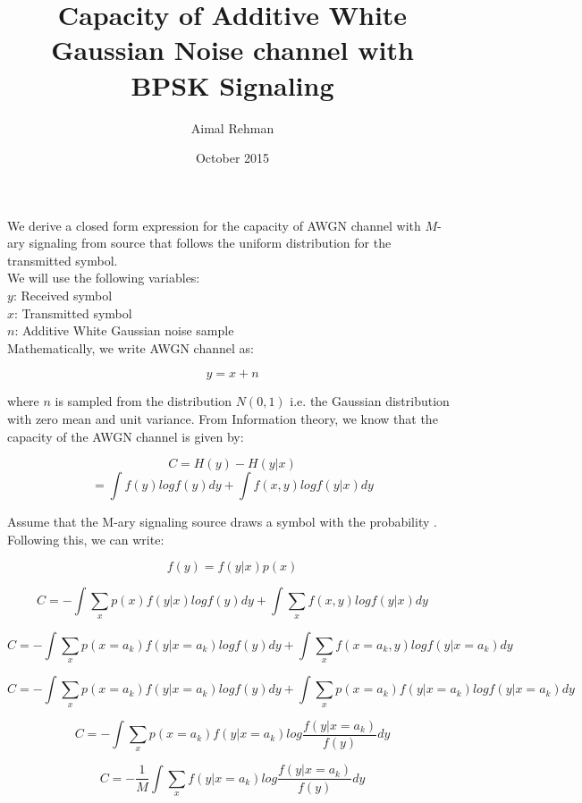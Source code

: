 \documentclass{article}
\title{Capacity of Additive White Gaussian Noise channel with BPSK Signaling}
\author{Aimal Rehman}
\date{October 2015}
\begin{document}
\maketitle

\noindent We derive a closed form expression for the capacity of AWGN channel with $M$-ary signaling from source that follows the uniform distribution for the transmitted symbol.
\\
\noindent We will use the following variables:\\
$y$: Received symbol\\
$x$: Transmitted symbol\\
$n$: Additive White Gaussian noise sample\\

\noindent Mathematically, we write AWGN channel as:

\[y = x + n \]

\noindent where $n$ is sampled from the distribution $N(0,1)$ i.e. the Gaussian distribution with zero mean and unit variance. From Information theory, we know that the capacity of the AWGN channel is given by:

\[C = H(y) - H(y|x) \]
\[= \int f(y) log f(y) dy + \int f(x,y) log f(y|x) dy \]

\noindent Assume that the M-ary signaling source  draws a symbol  with the probability . Following this, we can write:

\[f(y) = f(y|x)p(x) \]

\[C = -\int\sum_x p(x)f(y|x)logf(y) dy + \int\sum_x f(x,y) log f(y|x) dy \]

\[C = -\int\sum_x p(x=a_k)f(y|x=a_k) log f(y) dy + \int\sum_x f(x=a_k,y) log f(y|x=a_k) dy \]

\[C = -\int\sum_x p(x=a_k)f(y|x=a_k) log f(y) dy + \int\sum_x p(x=a_k)f(y|x=a_k) log f(y|x=a_k) dy \]

\[C = -\int\sum_x p(x=a_k)f(y|x=a_k) log \frac{f(y|x=a_k)}{f(y)} dy \]

\[C = -\frac{1}{M} \int\sum_x f(y|x=a_k) log \frac{f(y|x=a_k)}{f(y)} dy \]
\end{document}
